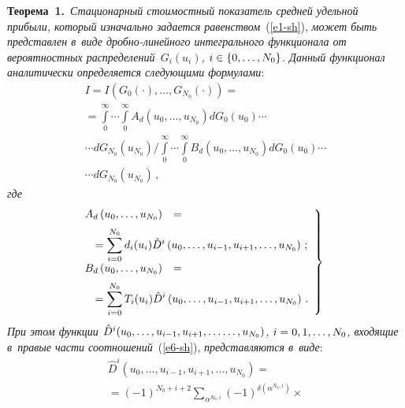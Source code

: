 \begin{multicols}{2}
  \noindent
  \textbf{Теорема~1.}\ \textit{Стационарный стоимостный показатель 
средней удельной прибыли, который изначально задается равенством}~(\ref{e1-sh}), 
\textit{может быть пред\-став\-лен в~виде дроб\-но-ли\-ней\-но\-го интегрального 
функционала от вероятностных распределений~$G_i(u_i)$, $i\hm\in \{0,\ldots 
,N_0\}$. Данный функ\-цио\-нал аналитически определяется сле\-ду\-ющи\-ми 
формулами}:
  \begin{multline}
  I=I\left( G_0(\cdot),\ldots ,G_{N_0}(\cdot)\right) ={}\\
  {}= %
  \int\limits_0^\infty\!\!\cdots\!\!\int\limits_0^\infty 
  \!\!\!A_d(u_0,\ldots , u_{N_0}) 
dG_0(u_0)\cdots%
\\
\cdots dG_{N_0}(u_{N_0})%
\Bigg/ \int\limits_0^\infty\!\!\cdots\!\!\int\limits_0^\infty 
  \!\!\!B_d(u_0,\ldots , u_{N_0}) 
dG_0(u_0)\cdots\\
\cdots dG_{N_0}(u_{N_0})\,,
  \label{e5-sh}
  \end{multline}
  \textit{где}
  \begin{equation}
  \left.
  \begin{array}{rl}
  \hspace*{-3mm}A_d\left( u_0,\ldots, u_{N_0}\right) &={}\\[6pt]
  &\hspace*{-26mm}{}=\displaystyle \sum\limits_{i=0}^{N_0} d_i(u_i) 
\hat{D}^i \left( u_0, \ldots , u_{i-1}, u_{i+1},\ldots , u_{N_0}\right)\,;\\[6pt]
  \hspace*{-3mm}B_d\left( u_0,\ldots, u_{N_0}\right) &= {}\\[6pt]
  &\hspace*{-26mm}{}=\displaystyle\sum\limits_{i=0}^{N_0} T_i(u_i) 
\hat{D}^i \left( u_0, \ldots , u_{i-1}, u_{i+1},\ldots , u_{N_0}\right)\,. %
\end{array}
\right\}
\label{e6-sh}
  \end{equation}
    \textit{При этом функции $\hat{D}^i(u_0, \ldots , u_{i-1}, u_{i+1},\ldots\linebreak 
  \ldots, 
u_{N_0})$, $i\hm=0,1,\ldots ,N_0$, входящие в~правые час\-ти 
соотношений}~(\ref{e6-sh}), \textit{пред\-став\-ля\-ют\-ся в~виде}: 
  \begin{multline}
  \hat{D}^i \left( u_0,\ldots , u_{i-1}, u_{i+1}, \ldots , u_{N_0}\right) ={}\\
  {}=
  (-1)^{N_0+i+2} \sum\limits_{\alpha^{N_0,i}} (-1)^{\delta\left(\alpha^{N_0,i}\right)} 
  \times{}\\

\end{multline}
\end{multicols}
